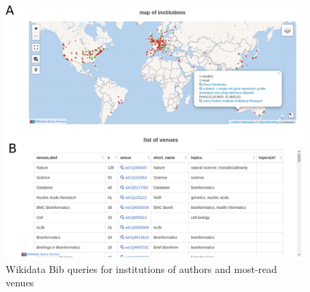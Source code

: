 \begin{figure}
\hypertarget{fig:dashboard}{%
\centering
\includegraphics{images/wikidata_bib_display.png}
\caption{Wikidata Bib queries for institutions of authors and most-read venues}\label{fig:dashboard}
}
\end{figure}

